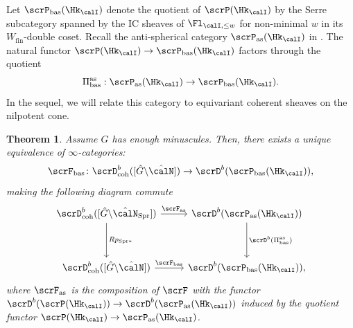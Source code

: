 \documentclass[10pt, reqno]{amsart}
\theoremstyle{plain}
\newtheorem{theorem}{Theorem}[section]
\theoremstyle{definition}
\numberwithin{equation}{section}
\begin{document}
Let $\scrP_{\mathrm{bas}}(\Hk_{\calI})$ denote the quotient of $\scrP(\Hk_\calI)$ by the Serre subcategory spanned by the IC sheaves of $\Fl_{ \calI,\leq w}$ for non-minimal $w$ in its $W_{\mathrm{fin}}$-double coset. Recall the anti-spherical category $\scrP_\mathrm{as}(\Hk_{\calI})$ in . The natural functor $\scrP(\Hk_{\calI})\rightarrow\scrP_{\mathrm{bas}}(\Hk_{\calI})	$
factors through the quotient  
\begin{equation}
	\Pi^{\mathrm{as}}_{\mathrm{bas}}:\scrP_\mathrm{as}(\Hk_{\calI})\rightarrow \scrP_{\mathrm{bas}}(\Hk_{\calI}).
\end{equation}
In the sequel, we will relate this category to equivariant coherent sheaves on the nilpotent cone.	
\begin{theorem}\label{perverse_description_of_coherent_sheaves}
	Assume $G$ has enough minuscules. Then, there exists a unique equivalence of $\infty$-categories:
	\begin{equation}
		\scrF_{\mathrm{bas}}\colon \scrD^b_\mathrm{coh}([\hat{G}\backslash\hat{\calN}])\rightarrow \scrD^b(\scrP_{\mathrm{bas}}(\Hk_{\calI})) ,
	\end{equation}
	making the following diagram commute
	\begin{equation}
		\begin{tikzcd}[row sep=huge]
			\scrD^b_\mathrm{coh}([\hat{G}\backslash\hat{\calN}_{\mathrm{Spr}}]) \arrow[r, "\scrF_\mathrm{as}"] \arrow [d,"Rp_{\mathrm{Spr}*}"] & \scrD^b(\scrP_\mathrm{as}(\Hk_{\calI})) \arrow [d,"\scrD^b({\Pi^{\mathrm{as}}_{\mathrm{bas}}})"] \\
			\scrD^b_\mathrm{coh}([\hat{G}\backslash\hat{\calN}])\arrow[r,"\scrF_\mathrm{bas}"] &\scrD^b(\scrP_{\mathrm{bas}}(\Hk_{\calI})),
		\end{tikzcd}
	\end{equation}
	where $\scrF_\mathrm{as}$ is the composition of $\scrF$ with the functor $\scrD^b(\scrP(\Hk_{\calI}))\rightarrow \scrD^b(\scrP_\mathrm{as}(\Hk_{\calI}))$ induced by the quotient functor $\scrP(\Hk_{\calI})\rightarrow \scrP_\mathrm{as}(\Hk_{\calI})$.
\end{theorem}
\end{document}
